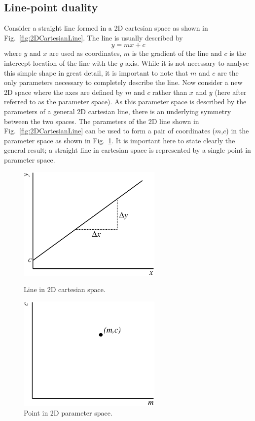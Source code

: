 \subsection{Line-point duality}
\label{subsec:LinePointDuality}
Consider a straight line formed in a 2D cartesian space as shown in Fig.~\ref{fig:2DCartesianLine}.  The line is usually described by
\begin{equation}
  y = mx + c
  \label{eq:2DLineCartesean}
\end{equation}
where $y$ and $x$ are used as coordinates, $m$ is the gradient of the line and $c$ is the intercept location of the line with the $y$ axis.  While it is not necessary to analyse this simple shape in great detail, it is important to note that $m$ and $c$ are the only parameters necessary to completely describe the line.  
\newline
Now consider a new 2D space where the axes are defined by $m$ and $c$ rather than $x$ and $y$ (here after referred to as the parameter space).  As this parameter space is described by the parameters of a general 2D cartesian line, there is an underlying symmetry between the two spaces.  The parameters of the 2D line shown in Fig.~\ref{fig:2DCartesianLine} can be used to form a pair of coordinates ($m$,$c$) in the parameter space as shown in Fig.~\ref{fig:2DParameterPoint}.  It is important here to state clearly the general result; a straight line in cartesian space is represented by a single point in parameter space. 
\begin{figure}
  \centering
  \parbox{7cm}{
    \includegraphics[width=7cm]{images/hough_transform/cartesian_line}
    \caption{Line in 2D cartesian space.}
    \label{fig:2DCartesianLine}}
    \qquad
    \begin{minipage}{7cm}
      \includegraphics[width=7cm]{images/hough_transform/parameter_point}
      \caption{Point in 2D parameter space.}
      \label{fig:2DParameterPoint}
    \end{minipage}
\end{figure}
